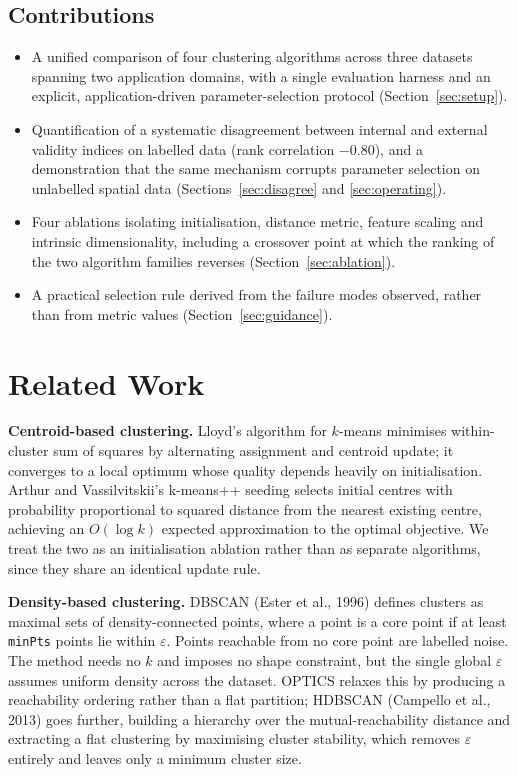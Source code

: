 \documentclass[11pt,a4paper]{article}
\begin{document}
\subsection{Contributions}
\begin{itemize}\itemsep1pt
\item A unified comparison of four clustering algorithms across three datasets
spanning two application domains, with a single evaluation harness and an
explicit, application-driven parameter-selection protocol
(Section~\ref{sec:setup}).
\item Quantification of a systematic disagreement between internal and external
validity indices on labelled data (rank correlation $-0.80$), and a
demonstration that the same mechanism corrupts parameter selection on unlabelled
spatial data (Sections~\ref{sec:disagree} and \ref{sec:operating}).
\item Four ablations isolating initialisation, distance metric, feature scaling
and intrinsic dimensionality, including a crossover point at which the ranking
of the two algorithm families reverses (Section~\ref{sec:ablation}).
\item A practical selection rule derived from the failure modes observed, rather
than from metric values (Section~\ref{sec:guidance}).
\end{itemize}

\section{Related Work}

\textbf{Centroid-based clustering.} Lloyd's algorithm for $k$-means minimises
within-cluster sum of squares by alternating assignment and centroid update; it
converges to a local optimum whose quality depends heavily on initialisation.
Arthur and Vassilvitskii's k-means++ seeding selects initial centres with
probability proportional to squared distance from the nearest existing centre,
achieving an $O(\log k)$ expected approximation to the optimal objective. We
treat the two as an initialisation ablation rather than as separate algorithms,
since they share an identical update rule.

\textbf{Density-based clustering.} DBSCAN (Ester et al., 1996) defines clusters
as maximal sets of density-connected points, where a point is a core point if at
least \texttt{minPts} points lie within $\varepsilon$. Points reachable from no
core point are labelled noise. The method needs no $k$ and imposes no shape
constraint, but the single global $\varepsilon$ assumes uniform density across
the dataset. OPTICS relaxes this by producing a reachability ordering rather than
a flat partition; HDBSCAN (Campello et al., 2013) goes further, building a
hierarchy over the mutual-reachability distance and extracting a flat clustering
by maximising cluster stability, which removes $\varepsilon$ entirely and leaves
only a minimum cluster size.
\end{document}
